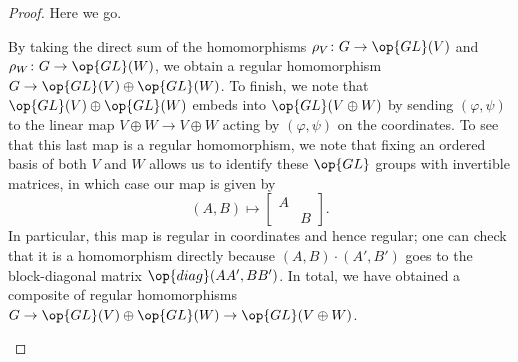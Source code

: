 \documentclass[../notes.tex]{subfiles}
\begin{document}
\begin{proof}
	Here we go.
	\begin{listalph}
		\item By taking the direct sum of the homomorphisms $\rho_V\colon G\to\op{GL}(V)$ and $\rho_W\colon G\to\op{GL}(W)$, we obtain a regular homomorphism $G\to\op{GL}(V)\oplus\op{GL}(W)$. To finish, we note that $\op{GL}(V)\oplus\op{GL}(W)$ embeds into $\op{GL}(V\oplus W)$ by sending $(\varphi,\psi)$ to the linear map $V\oplus W\to V\oplus W$ acting by $(\varphi,\psi)$ on the coordinates. To see that this last map is a regular homomorphism, we note that fixing an ordered basis of both $V$ and $W$ allows us to identify these $\op{GL}$ groups with invertible matrices, in which case our map is given by
		\[(A,B)\mapsto\begin{bmatrix}
			A \\ & B
		\end{bmatrix}.\]
		In particular, this map is regular in coordinates and hence regular; one can check that it is a homomorphism directly because $(A,B)\cdot(A',B')$ goes to the block-diagonal matrix $\op{diag}(AA',BB')$. In total, we have obtained a composite of regular homomorphisms $G\to\op{GL}(V)\oplus\op{GL}(W)\to\op{GL}(V\oplus W)$.


\end{listalph}
\end{proof}
\end{document}
